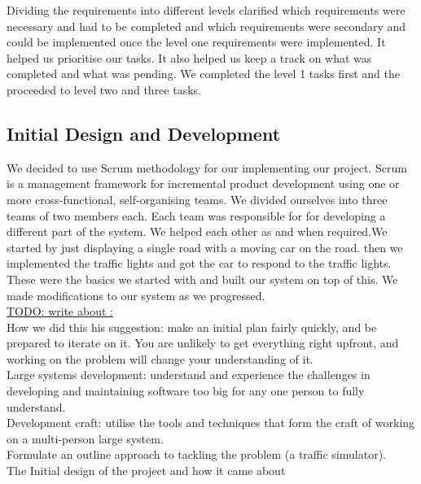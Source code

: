 \documentclass{article}[11pt,Tahoma]
\begin{document}
\begin{Abstract}
\begin{itemize}
			 \end{itemize}
				
			 Dividing the requirements into different levels clarified which requirements were necessary and had to be completed and which requirements were secondary and could be implemented once the level one requirements were implemented. It helped us prioritise our tasks. It also helped us keep a track on what was completed and what was pending. We completed the level 1 tasks first and the proceeded to level two and three tasks. 			 
			 
		 \subsection{Initial Design and Development}
		  	We decided to use Scrum methodology for our implementing our project. Scrum is a management framework for incremental product development using one or more cross-functional, self-organising teams. We divided ourselves into three teams of two members each. Each team was responsible for for developing a different part of the system. We helped each other as and when required.We started by just displaying a single road with a moving car on the road. then we implemented the traffic lights and got the car to respond to the traffic lights. These were the basics we started with and built our system on top of this. We made modifications to our system as we progressed. \\
		 
		 \underline{ TODO: write about :}\\
		 	How we did this his suggestion: make an initial plan fairly quickly, and be prepared to iterate on it. You are unlikely to get everything right upfront, and working on the problem will change your understanding of it.\\
		 
			Large systems development: understand and experience the challenges in developing and maintaining software too big for any one person to fully understand.\\
		 
		 	Development craft: utilise the tools and techniques that form the craft of working on a multi-person large system.\\
		 
		 	Formulate an outline approach to tackling the problem (a traffic simulator). \\
		 
		 	The Initial design of the project and how it came about\\
		 

\end{Abstract}
\end{document}
